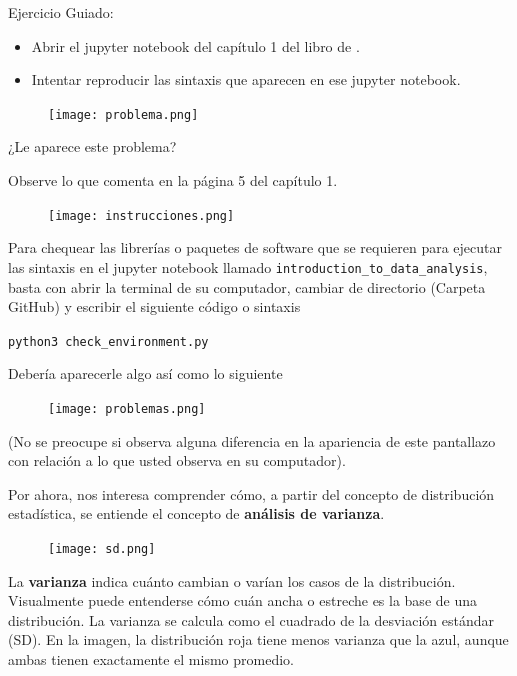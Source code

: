 \documentclass[aspectratio=169]{beamer}
\begin{document}
\begin{frame}
Ejercicio Guiado:
\vspace{0.5cm}
\begin{itemize}
\item Abrir el jupyter notebook del capítulo 1 del libro de \citeauthor{Molin2021} \citeyear{Molin2021}.
\item Intentar reproducir las sintaxis que aparecen en ese jupyter notebook.
\end{itemize}
\begin{figure}
\centering
\texttt{[image: problema.png]}
\end{figure}
\centering
¿Le aparece este problema?
\end{frame}

\begin{frame}
Observe lo que \citeauthor{Molin2021} \citeyear{Molin2021} comenta en la página 5 del capítulo 1.
\begin{figure}
\centering
\texttt{[image: instrucciones.png]}
\end{figure}
Para chequear las librerías o paquetes de software que se requieren para ejecutar las sintaxis en el jupyter notebook llamado \texttt{introduction\_to\_data\_analysis}, basta con abrir la terminal de su computador, cambiar de directorio (Carpeta GitHub) y escribir el siguiente código o sintaxis\\
\begin{center}
\texttt{python3 check\_environment.py}    
\end{center}
\end{frame}

\begin{frame}
Debería aparecerle algo así como lo siguiente
\begin{figure}
\centering
\texttt{[image: problemas.png]}
\end{figure}
(No se preocupe si observa alguna diferencia en la apariencia de este pantallazo con relación a lo que usted observa en su computador).
\end{frame}

\begin{frame}
Por ahora, nos interesa comprender cómo, a partir del concepto de distribución estadística, se entiende el concepto de \textbf{análisis de varianza}.   
\begin{figure}
\centering
\texttt{[image: sd.png]}
\end{figure}
La \textbf{varianza} indica cuánto cambian o varían los casos de la distribución. Visualmente puede entenderse cómo cuán ancha o estreche es la base de una distribución. La varianza se calcula como el cuadrado de la desviación estándar (SD). En la imagen, la distribución roja tiene menos varianza que la azul, aunque ambas tienen exactamente el mismo promedio.
\end{frame}
\end{document}
